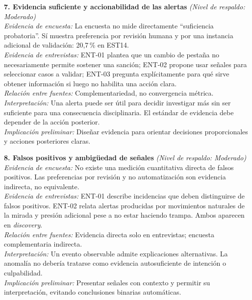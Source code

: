 \begin{center}\footnotesize
\begin{infobox}
\textbf{\textcolor{accent}{7. Evidencia suficiente y accionabilidad de las alertas}} \textit{(Nivel de respaldo: Moderado)}\\
\textit{Evidencia de encuesta:} La encuesta no mide directamente ``suficiencia probatoria''. Sí muestra preferencia por revisión humana y por una instancia adicional de validación: 20,7\,\% en EST14.\\
\textit{Evidencia de entrevistas:} ENT-01 plantea que un cambio de pestaña no necesariamente permite sostener una sanción; ENT-02 propone usar señales para seleccionar casos a validar; ENT-03 pregunta explícitamente para qué sirve obtener información si luego no habilita una acción clara.\\
\textit{Relación entre fuentes:} Complementariedad, no convergencia métrica.\\
\textit{Interpretación:} Una alerta puede ser útil para decidir investigar más sin ser suficiente para una consecuencia disciplinaria. El estándar de evidencia debe depender de la acción posterior.\\
\textit{Implicación preliminar:} Diseñar evidencia para orientar decisiones proporcionales y acciones posteriores claras.
\end{infobox}
\vspace{2pt}
\begin{infobox}
\textbf{\textcolor{accent}{8. Falsos positivos y ambigüedad de señales}} \textit{(Nivel de respaldo: Moderado)}\\
\textit{Evidencia de encuesta:} No existe una medición cuantitativa directa de falsos positivos. Las preferencias por revisión y no automatización son evidencia indirecta, no equivalente.\\
\textit{Evidencia de entrevistas:} ENT-01 describe incidencias que deben distinguirse de falsos positivos. ENT-02 relata alertas producidas por movimientos naturales de la mirada y presión adicional pese a no estar haciendo trampa. Ambos aparecen en \textit{discovery}.\\
\textit{Relación entre fuentes:} Evidencia directa solo en entrevistas; encuesta complementaria indirecta.\\
\textit{Interpretación:} Un evento observable admite explicaciones alternativas. La anomalía no debería tratarse como evidencia autosuficiente de intención o culpabilidad.\\
\textit{Implicación preliminar:} Presentar señales con contexto y permitir su interpretación, evitando conclusiones binarias automáticas.

\end{infobox}
\end{center}

